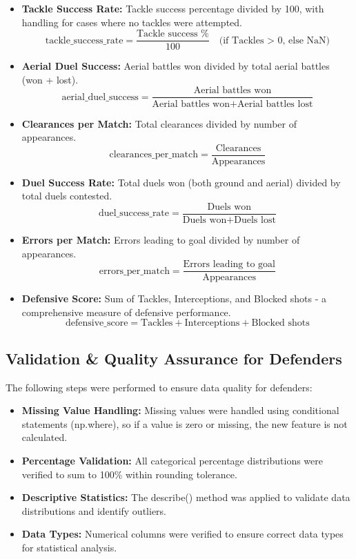 \documentclass[12pt,a4paper]{article}
\begin{document}
\begin{itemize}
    \item \textbf{Tackle Success Rate:} Tackle success percentage divided by 100, with handling for cases where no tackles were attempted.
    \[
    \text{tackle\_success\_rate} = \frac{\text{Tackle success \%}}{100} \quad \text{(if Tackles > 0, else NaN)}
    \]
    
    \item \textbf{Aerial Duel Success:} Aerial battles won divided by total aerial battles (won + lost).
    \[
    \text{aerial\_duel\_success} = \frac{\text{Aerial battles won}}{\text{Aerial battles won} + \text{Aerial battles lost}}
    \]
    
    \item \textbf{Clearances per Match:} Total clearances divided by number of appearances.
    \[
    \text{clearances\_per\_match} = \frac{\text{Clearances}}{\text{Appearances}}
    \]
    
    \item \textbf{Duel Success Rate:} Total duels won (both ground and aerial) divided by total duels contested.
    \[
    \text{duel\_success\_rate} = \frac{\text{Duels won}}{\text{Duels won} + \text{Duels lost}}
    \]
    
    \item \textbf{Errors per Match:} Errors leading to goal divided by number of appearances.
    \[
    \text{errors\_per\_match} = \frac{\text{Errors leading to goal}}{\text{Appearances}}
    \]
    
    \item \textbf{Defensive Score:} Sum of Tackles, Interceptions, and Blocked shots - a comprehensive measure of defensive performance.
    \[
    \text{defensive\_score} = \text{Tackles} + \text{Interceptions} + \text{Blocked shots}
    \]
\end{itemize}

\subsection{Validation \& Quality Assurance for Defenders}

The following steps were performed to ensure data quality for defenders:

\begin{itemize}
    \item \textbf{Missing Value Handling:} Missing values were handled using conditional statements (np.where), so if a value is zero or missing, the new feature is not calculated.
    \item \textbf{Percentage Validation:} All categorical percentage distributions were verified to sum to 100\% within rounding tolerance.
    \item \textbf{Descriptive Statistics:} The describe() method was applied to validate data distributions and identify outliers.
    \item \textbf{Data Types:} Numerical columns were verified to ensure correct data types for statistical analysis.
\end{itemize}
\newpage
\end{document}
